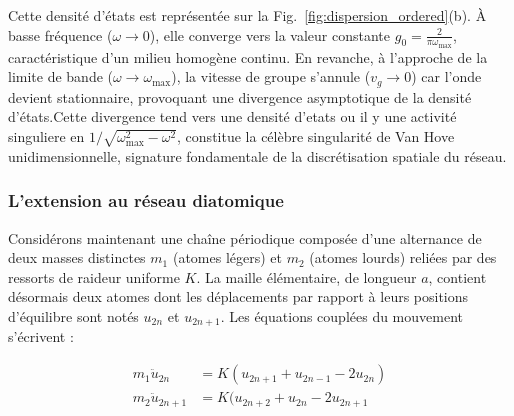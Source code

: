 Cette densité d'états est représentée sur la Fig.~\ref{fig:dispersion_ordered}(b). À basse fréquence ($\omega \to 0$), elle converge vers la valeur constante $g_0 = \frac{2}{\pi \omega_{\max}}$, caractéristique d'un milieu homogène continu. En revanche, à l'approche de la limite de bande ($\omega \to \omega_{\max}$), la vitesse de groupe s'annule ($v_g \to 0$) car l'onde devient stationnaire, provoquant une divergence asymptotique de la densité d'états.Cette divergence tend vers une densité  d'etats ou il y une activité singuliere en $1/\sqrt{\omega_{\max}^2 - \omega^2}$, constitue la célèbre singularité de Van Hove unidimensionnelle, signature fondamentale de la discrétisation spatiale du réseau.



\subsubsection[L'extension au réseau diatomique]{L'extension au réseau diatomique}
Considérons maintenant une chaîne périodique composée d'une alternance de deux masses distinctes $m_1$ (atomes légers) et $m_2$ (atomes lourds) reliées par des ressorts de raideur uniforme $K$. La maille élémentaire, de longueur $a$, contient désormais deux atomes dont les déplacements par rapport à leurs positions d'équilibre sont notés $u_{2n}$ et $u_{2n+1}$. Les équations couplées du mouvement s'écrivent :

\begin{subequations}
    \begin{align}
        m_1 \ddot{u}_{2n} &= K(u_{2n+1} + u_{2n-1} - 2u_{2n}) \\
        m_2 \ddot{u}_{2n+1} &= K(u_{2n+2} + u_{2n} - 2u_{2n+1}
    \end{align}
\end{subequations}

